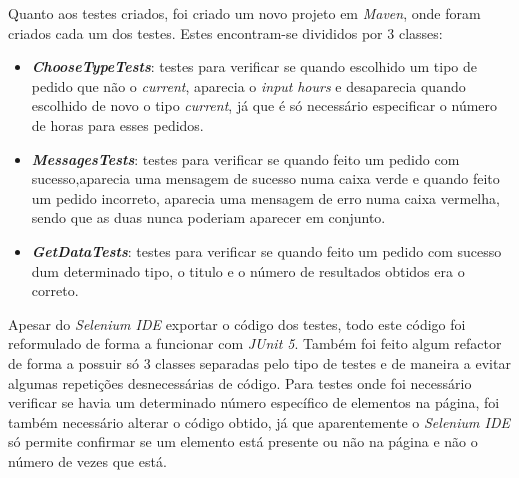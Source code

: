 Quanto aos testes criados, foi criado um novo projeto em \textit{Maven}, onde foram criados cada um dos testes. Estes encontram-se divididos por 3 classes: 
\begin{itemize}
   \item \textbf{\textit{ChooseTypeTests}}: testes para verificar se quando escolhido um tipo de pedido que não o \textit{current}, aparecia o \textit{input} \textit{hours} e desaparecia quando escolhido de novo o tipo \textit{current}, já que é só necessário especificar o número de horas para esses pedidos.
   \item \textbf{\textit{MessagesTests}}: testes para verificar se quando feito um pedido com sucesso,aparecia uma mensagem de sucesso numa caixa verde e quando feito um pedido incorreto, aparecia uma mensagem de erro numa caixa vermelha, sendo que as duas nunca poderiam aparecer em conjunto.
   \item \textbf{\textit{GetDataTests}}: testes para verificar se quando feito um pedido com sucesso dum determinado tipo, o titulo e o número de resultados obtidos era o correto.
\end{itemize}

Apesar do \textit{Selenium IDE} exportar o código dos testes, todo este código foi reformulado de forma a funcionar com \textit{JUnit 5}. Também foi feito algum refactor de forma a possuir só 3 classes separadas pelo tipo de testes e de maneira a evitar algumas repetições desnecessárias de código. Para testes onde foi necessário verificar se havia um determinado número específico de elementos na página, foi também necessário alterar o código obtido, já que aparentemente o \textit{Selenium IDE} só permite confirmar se um elemento está presente ou não na página e não o número de vezes que está.

